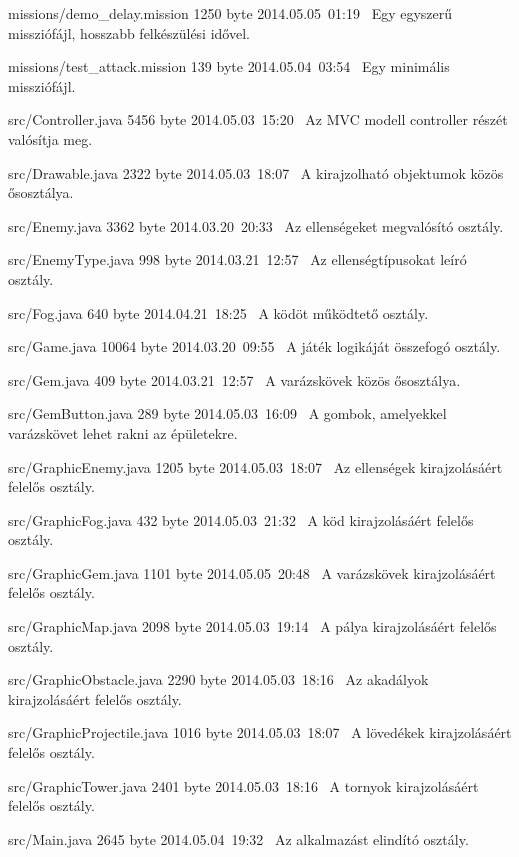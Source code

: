 \begin{fajllista}
\fajl
{missions/demo\_delay.mission}
{1250 byte}
{2014.05.05~01:19~}
{Egy egyszerű missziófájl, hosszabb felkészülési idővel.}

\fajl
{missions/test\_attack.mission}
{139 byte}
{2014.05.04~03:54~}
{Egy minimális missziófájl.}



\fajl
{src/Controller.java}
{5456 byte}
{2014.05.03~15:20~}
{Az MVC modell controller részét valósítja meg.}

\fajl
{src/Drawable.java}
{2322 byte}
{2014.05.03~18:07~}
{A kirajzolható objektumok közös ősosztálya.}

\fajl
{src/Enemy.java}
{3362 byte}
{2014.03.20~20:33~}
{Az ellenségeket megvalósító osztály.}

\fajl
{src/EnemyType.java}
{998 byte}
{2014.03.21~12:57~}
{Az ellenségtípusokat leíró osztály.}

\fajl
{src/Fog.java}
{640 byte}
{2014.04.21~18:25~}
{A ködöt működtető osztály.}

\fajl
{src/Game.java}
{10064 byte}
{2014.03.20~09:55~}
{A játék logikáját összefogó osztály.}

\fajl
{src/Gem.java}
{409 byte}
{2014.03.21~12:57~}
{A varázskövek közös ősosztálya.}

\fajl
{src/GemButton.java}
{289 byte}
{2014.05.03~16:09~}
{A gombok, amelyekkel varázskövet lehet rakni az épületekre.}

\fajl
{src/GraphicEnemy.java}
{1205 byte}
{2014.05.03~18:07~}
{Az ellenségek kirajzolásáért felelős osztály.}

\fajl
{src/GraphicFog.java}
{432 byte}
{2014.05.03~21:32~}
{A köd kirajzolásáért felelős osztály.}

\fajl
{src/GraphicGem.java}
{1101 byte}
{2014.05.05~20:48~}
{A varázskövek kirajzolásáért felelős osztály.}

\fajl
{src/GraphicMap.java}
{2098 byte}
{2014.05.03~19:14~}
{A pálya kirajzolásáért felelős osztály.}

\fajl
{src/GraphicObstacle.java}
{2290 byte}
{2014.05.03~18:16~}
{Az akadályok kirajzolásáért felelős osztály.}

\fajl
{src/GraphicProjectile.java}
{1016 byte}
{2014.05.03~18:07~}
{A lövedékek kirajzolásáért felelős osztály.}

\fajl
{src/GraphicTower.java}
{2401 byte}
{2014.05.03~18:16~}
{A tornyok kirajzolásáért felelős osztály.}

\fajl
{src/Main.java}
{2645 byte}
{2014.05.04~19:32~}
{Az alkalmazást elindító osztály.}


\end{fajllista}

